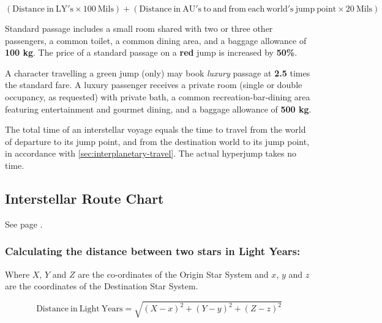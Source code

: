 \begin{large}
$$(\mathrm{Distance~in~LY's}\times\mathrm{100~Mils}) +
(\mathrm{Distance~in~AU's~to~and~from~each~world's~jump~point}\times\mathrm{20~Mils})$$ 
\end{large}

Standard passage includes a small room shared with two or three other
passengers, a common toilet, a common dining area, and a baggage
allowance of \textbf{100 kg}. The price of a standard passage on a
\textbf{red} jump is increased by \textbf{50\%}.

A character travelling a green jump (only) may book \emph{luxury}
passage at \textbf{2.5} times the standard fare. A luxury passenger
receives a private room (single or double occupancy, as requested)
with private bath, a common recreation-bar-dining area featuring
entertainment and gourmet dining, and a baggage allowance of
\textbf{500 kg}.

The total time of an interstellar voyage equals the time to travel
from the world of departure to its jump point, and from the
destination world to its jump point, in accordance with
\ref{sec:interplanetary-travel}. The actual hyperjump takes no time.

\subsection{Interstellar Route Chart}
\label{sec:interstellar-route-chart}

See page \pageref{tab:interstellar-route}.


\subsubsection*{Calculating the distance between two stars in Light Years:}

Where $X$, $Y$ and $Z$ are the co-ordinates of the Origin Star System
and $x$, $y$ and $z$ are the coordinates of the Destination Star
System.

\begin{large}
$$\mathrm{Distance~in~Light~Years} = \sqrt{(X - x)^2 + (Y - y)^2 +
  (Z-z)^2}$$
\end{large}

